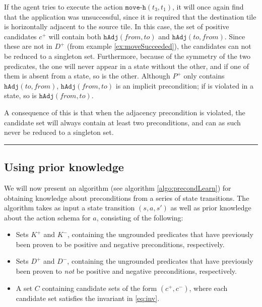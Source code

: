 \documentclass[../Master.tex]{subfiles}
\begin{document}
\begin{example}
    If the agent tries to execute the action $\texttt{move-h}(t_3, t_1)$, it will once again find that the application was unsuccessful, since it is required that the destination tile is horizontally adjacent to the source tile. In this case, the set of positive candidates $c^+$ will contain both $\texttt{hAdj}(from, to)$ and $\texttt{hAdj}(to, from)$. Since these are not in $D^+$ (from example \ref{ex:moveSucceeded}), the candidates can not be reduced to a singleton set. Furthermore, because of the symmetry of the two predicates, the one will never appear in a state without the other, and if one of them is absent from a state, so is the other. Although $P^+$ only contains $\texttt{hAdj}(to, from)$, $\texttt{hAdj}(from, to)$ is an implicit precondition; if is violated in a state, so is $\texttt{hAdj}(from, to)$.

    A consequence of this is that when the adjacency precondition is violated, the candidate set will always contain at least two preconditions, and can as such never be reduced to a singleton set.

    \noindent\rule{\textwidth}{1pt}
\end{example}

\subsection*{Using prior knowledge}

We will now present an algorithm (see algorithm \ref{algo:precondLearn}) for obtaining knowledge about preconditions from a series of state transitions. The algorithm takes as input a state transition $(s, a, s')$ as well as prior knowledge about the action schema for $a$, consisting of the following:

\begin{itemize}
    \item Sets $K^+$ and $K^-$, containing the ungrounded predicates that have previously been proven to be positive and negative preconditions, respectively.
    \item Sets $D^+$ and $D^-$, containing the ungrounded predicates that have previously been proven to \textit{not} be positive and negative preconditions, respectively.
    \item A set $C$ containing candidate sets of the form $\left(c^+, c^- \right)$, where each candidate set satisfies the invariant in \eqref{eq:inv}.
\end{itemize}
\end{document}
